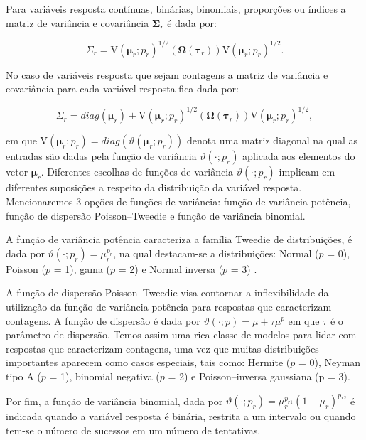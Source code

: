 \documentclass[AMA,STIX1COL]{WileyNJD-v2}
\begin{document}
Para variáveis resposta contínuas, binárias, binomiais, proporções ou índices a matriz de variância e covariância $\boldsymbol{\Sigma}_r$ é dada por:

$$
\Sigma_r =
\mathrm{V}\left(\boldsymbol{\mu}_r; p_r\right)^{1/2}(\boldsymbol{\Omega}\left(\boldsymbol{\tau}_r\right))\mathrm{V}\left(\boldsymbol{\mu}_r; p_r\right)^{1/2}.
$$

No caso de variáveis resposta que sejam contagens a matriz de variância e covariância para cada variável resposta fica dada por:

$$
\Sigma_r = diag(\boldsymbol{\mu}_r)+ \mathrm{V}\left(\boldsymbol{\mu}_r; p_r\right)^{1/2}(\boldsymbol{\Omega}\left(\boldsymbol{\tau}_r\right))\mathrm{V}\left(\boldsymbol{\mu}_r; p_r\right)^{1/2},
$$

\noindent em que $\mathrm{V}\left(\boldsymbol{\mu}_r; p_r\right) = diag(\vartheta(\boldsymbol{\mu}_r; p_r))$ denota uma matriz diagonal na qual as entradas são dadas pela função de variância $\vartheta(\cdot; p_r)$ aplicada aos elementos do vetor $\boldsymbol{\mu}_r$. Diferentes escolhas de funções de variância $\vartheta(\cdot; p_r)$ implicam em diferentes suposições a respeito da distribuição da variável resposta. Mencionaremos 3 opções de funções de variância: função de variância potência, função de dispersão Poisson–Tweedie e função de variância binomial.

A função de variância potência caracteriza a família Tweedie de distribuições, é dada por $\vartheta\left(\cdot; p_r\right) = \mu^{p_r}_r$, na qual destacam-se a distribuições: Normal ($p$ = 0), Poisson ($p$ = 1), gama ($p$ = 2) e  Normal inversa ($p$ = 3) \cite{Jorgensen87, Jorgensen97}. 

A função de dispersão Poisson–Tweedie \cite{Jorgensen15} visa contornar a inflexibilidade da utilização da função de variância potência para respostas que caracterizam contagens. A função de dispersão é dada por $\vartheta\left(\cdot; p\right) = \mu + \tau\mu^p$ em que $\tau$ é o parâmetro de dispersão. Temos assim uma rica classe de modelos para lidar com respostas que caracterizam contagens, uma vez que muitas distribuições importantes aparecem como casos especiais, tais como: Hermite ($p$ = 0), Neyman tipo A ($p$ = 1), binomial negativa ($p$ = 2) e Poisson–inversa gaussiana (p = $3$).

Por fim, a função de variância binomial, dada por $\vartheta\left(\cdot; p_r\right) = \mu^{p_{r1}}_r(1 - \mu_r)^{p_{r2}}$ é indicada quando a variável resposta é binária, restrita a um intervalo ou quando tem-se o número de sucessos em um número de tentativas.
\end{document}
